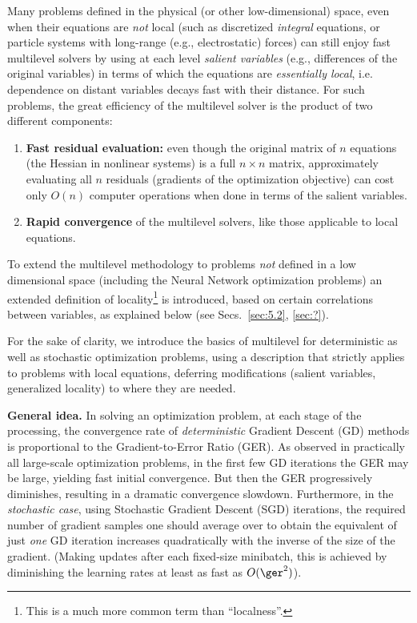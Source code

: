 \documentclass{article} %
\begin{document}
Many problems defined in the physical (or other low-dimensional) space, even when their equations are {\it not} local (such as discretized {\it integral} equations, or particle systems with long-range (e.g., electrostatic) forces) can still enjoy fast multilevel solvers by using at each level {\it salient variables} (e.g., differences of the original variables) in terms of which the equations are {\it essentially local}, i.e. dependence on distant variables decays fast with their distance. For such problems, the great efficiency of the multilevel solver is the product of two different components:
\begin{enumerate}
    \item[(1)] {\bf Fast residual evaluation:} even though the original matrix of $n$ equations (the Hessian in nonlinear systems) is a full $n \times n$ matrix, approximately evaluating all $n$ residuals (gradients of the optimization objective) can cost only $O(n)$ computer operations when done in terms of the salient variables.
    \item[(2)] {\bf Rapid convergence} of the multilevel solvers, like those applicable to local equations.
\end{enumerate}
To extend the multilevel methodology to problems {\it not} defined in a low dimensional space (including the Neural Network optimization problems) an extended definition of locality\footnote{This is a much more common term than ``localness''.} is introduced, based on certain correlations between variables, as explained below (see Secs.~\ref{sec:5.2}, \ref{sec:?}).

For the sake of clarity, we introduce the basics of multilevel for deterministic as well as stochastic optimization problems, using a description that strictly applies to problems with local equations, deferring modifications (salient variables, generalized locality) to where they are needed.

{\bf General idea.} In solving an optimization problem, at each stage of the processing, the convergence rate of {\it deterministic} Gradient Descent (GD) methods is proportional to the Gradient-to-Error Ratio (GER). As observed in practically all large-scale optimization problems, in the first few GD iterations the GER may be large, yielding fast initial convergence. But then the GER progressively diminishes, resulting in a dramatic convergence slowdown. Furthermore, in the {\it stochastic case}, using Stochastic Gradient Descent (SGD) iterations, the required number of gradient samples one should average over to obtain the equivalent of just {\it one} GD iteration increases quadratically with the inverse of the size of the gradient. (Making updates after each fixed-size minibatch, this is achieved by diminishing the learning rates at least as fast as $O(\ger^2)$).
\end{document}
